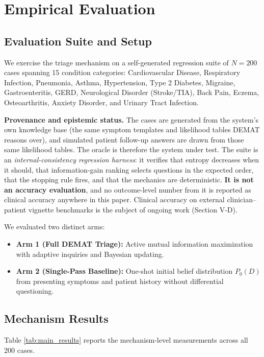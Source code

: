 \documentclass[10pt,twocolumn]{article}
\begin{document}
\section{Empirical Evaluation}

\subsection{Evaluation Suite and Setup}
We exercise the triage mechanism on a self-generated regression suite of $N = 200$ cases spanning 15 condition categories: Cardiovascular Disease, Respiratory Infection, Pneumonia, Asthma, Hypertension, Type 2 Diabetes, Migraine, Gastroenteritis, GERD, Neurological Disorder (Stroke/TIA), Back Pain, Eczema, Osteoarthritis, Anxiety Disorder, and Urinary Tract Infection.

\textbf{Provenance and epistemic status.} The cases are generated from the system's own knowledge base (the same symptom templates and likelihood tables DEMAT reasons over), and simulated patient follow-up answers are drawn from those same likelihood tables. The oracle is therefore the system under test. The suite is an \emph{internal-consistency regression harness}: it verifies that entropy decreases when it should, that information-gain ranking selects questions in the expected order, that the stopping rule fires, and that the mechanics are deterministic. \textbf{It is not an accuracy evaluation}, and no outcome-level number from it is reported as clinical accuracy anywhere in this paper. Clinical accuracy on external clinician--patient vignette benchmarks is the subject of ongoing work (Section V-D).

We evaluated two distinct arms:
\begin{itemize}
    \item \textbf{Arm 1 (Full DEMAT Triage):} Active mutual information maximization with adaptive inquiries and Bayesian updating.
    \item \textbf{Arm 2 (Single-Pass Baseline):} One-shot initial belief distribution $P_0(D)$ from presenting symptoms and patient history without differential questioning.
\end{itemize}

\subsection{Mechanism Results}
Table \ref{tab:main_results} reports the mechanism-level measurements across all 200 cases.
\end{document}

